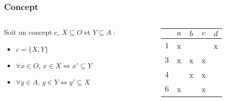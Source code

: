 \documentclass{beamer}
\begin{document}
\begin{frame}
	\frametitle{Concept}
	\begin{columns}[T] %
		\begin{column}{.48\textwidth}
			\begin{definition}
				Soit un concept $c$, $X \subseteq O$ et $Y \subseteq A$ :
				\begin{itemize}
					\item $c = \{X, Y\}$
					\item $\forall x \in O$, $x \in X \Leftrightarrow x' \subseteq Y$
					\item $\forall y \in A$, $y \in Y \Leftrightarrow y' \subseteq X$
				\end{itemize}
			\end{definition}
		\end{column}%
		\hfill%
		\begin{column}{.48\textwidth}
			\begin{center}
			\begin{tabular}{ l | c c c c }
				 & $a$ & $b$ & $c$ & $d$ \\
				\hline
				$1$ & x & & & x \\
				$3$ & x & x & x & \\
				$4$ & & x & x & \\
				$6$ & x & & x & \\
			\end{tabular}
			\end{center}
		\end{column}%
	\end{columns}
\end{frame}
\end{document}
